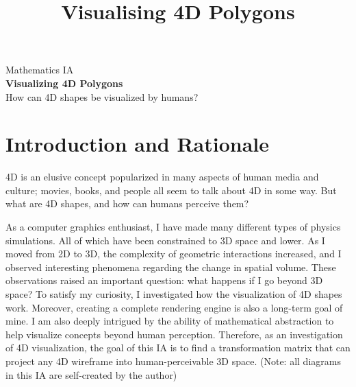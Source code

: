 \documentclass[12pt, letterpaper]{article}
\title{Visualising 4D Polygons}
\author{}
\date{}
\begin{document}
\setlength{\abovedisplayskip}{5pt}
\setlength{\belowdisplayskip}{5pt}
\allowdisplaybreaks
{}
\vspace{-0.9cm}
\begin{center}
    Mathematics IA\\
    \vspace{-0.5cm}
    \huge
    \textbf{Visualizing 4D Polygons}\\
    \normalsize
    \vspace{0.2cm}
    \normalsize
    How can 4D shapes be visualized by humans?
    \vspace{-0.4cm}\\
\end{center}

\section{Introduction and Rationale}
4D is an elusive concept popularized in many aspects of human media and culture; movies, books, and people all seem to talk about 4D in some way. But what are 4D shapes, and how can humans perceive them? 

As a computer graphics enthusiast, I have made many different types of physics simulations. All of which have been constrained to 3D space and lower. As I moved from 2D to 3D, the complexity of geometric interactions increased, and I observed interesting phenomena regarding the change in spatial volume. These observations raised an important question: what happens if I go beyond 3D space? To satisfy my curiosity, I investigated how the visualization of 4D shapes work. Moreover, creating a complete rendering engine is also a long-term goal of mine. I am also deeply intrigued by the ability of mathematical abstraction to help visualize concepts beyond human perception. Therefore, as an investigation of 4D visualization, the goal of this IA is to find a transformation matrix that can project any 4D wireframe into human-perceivable 3D space. (Note: all diagrams in this IA are self-created by the author)
\end{document}
